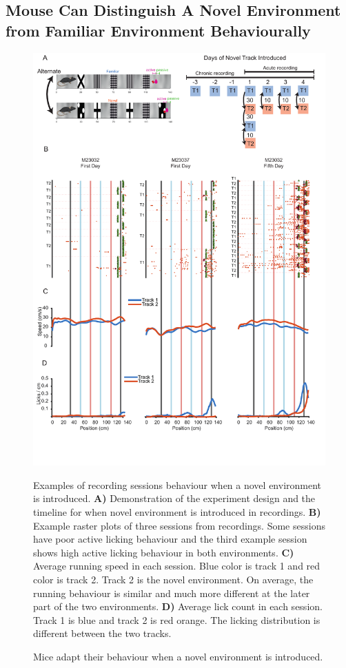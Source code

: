 \subsection{Mouse Can Distinguish A Novel Environment from Familiar Environment Behaviourally}
\begin{figure}
    \centering
    \includegraphics[width=1\linewidth]{figures//Chapter 3 Behaviour//Thesis Figures//figure_PDFs/fig6_novel_track_behaviour_examples.pdf}
    \caption{Mice adapt their behaviour when a novel environment is introduced.}

\medskip
\small
Examples of recording sessions behaviour when a novel environment is introduced. \textbf{A)} Demonstration of the experiment design and the timeline for when novel environment is introduced in recordings. \textbf{B)} Example raster plots of three sessions from recordings. Some sessions have poor active licking behaviour and the third example session shows high active licking behaviour in both environments. \textbf{C)} Average running speed in each session. Blue color is track 1 and red color is track 2. Track 2 is the novel environment. On average, the running behaviour is similar and much more different at the later part of the two environments. \textbf{D)}  Average lick count in each session. Track 1 is blue and track 2 is red orange. The licking distribution is different between the two tracks.  
    \label{fig:placeholder}
\end{figure}
